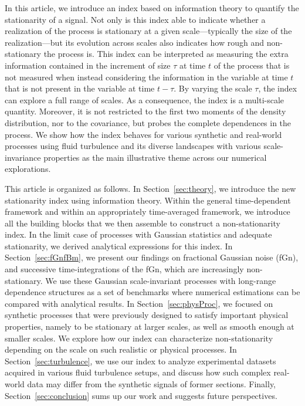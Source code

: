 \documentclass[aps,pra,groupedaddress,notitlepage]{revtex4-1}
\begin{document}
In this article, we introduce an index based on information theory to quantify the stationarity of a signal.
Not only is  this index able to indicate whether a realization of the process is stationary at a given scale---typically the size of the realization---but its evolution across scales also indicates how rough and non-stationary the process is.
This index can be interpreted as measuring the extra information contained in the increment of size $\tau$ at time $t$ of the process that is not measured when instead considering the information in the variable at time $t$ that is not present in the variable at time $t-\tau$. By varying the scale $\tau$, the index can explore a full range of scales. As a consequence, the index is a multi-scale quantity. Moreover, it is not restricted to the first two moments of the density distribution, nor to the covariance, but probes the complete dependences in the process. 
%
We show how the index behaves for various synthetic and real-world processes using fluid turbulence and its diverse landscapes with various scale-invariance properties as the main illustrative theme across our numerical explorations.


This article is organized as follows.
In Section~\ref{sec:theory}, we introduce the new stationarity index using information theory. Within the general time-dependent framework and within an appropriately time-averaged framework, we introduce all the building blocks that we then assemble to construct a non-stationarity index. In the limit case of processes with Gaussian statistics and adequate stationarity, we derived analytical expressions for this index. 
In Section~\ref{sec:fGnfBm}, we present our findings on fractional Gaussian noise (fGn), and successive time-integrations of the fGn, which are increasingly non-stationary. We use these Gaussian scale-invariant processes with long-range dependence structures as a set of benchmarks where numerical estimations can be compared with analytical results.
In Section~\ref{sec:physProc}, we focused on synthetic processes that were previously designed to satisfy important physical properties, namely to be stationary at larger scales, as well as smooth enough at smaller scales. We explore how our index 
can characterize non-stationarity depending on the scale on such realistic or physical processes.
In Section~\ref{sec:turbulence}, we use our index to analyze experimental datasets acquired in various fluid turbulence setups, and discuss how such complex real-world data may differ from the synthetic signals of former sections.
Finally, Section~\ref{sec:conclusion} sums up our work and suggests future perspectives. 
\end{document}
